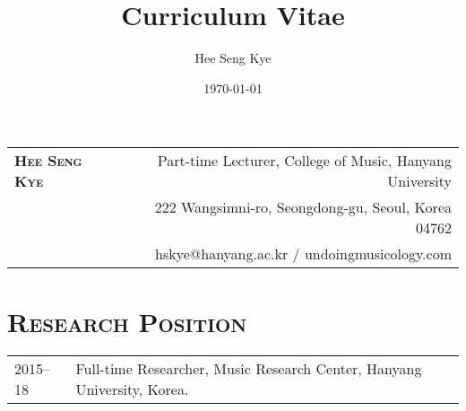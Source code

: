 \documentclass[a4paper,11pt]{article}
\title{Curriculum Vitae}
\author{Hee Seng Kye}
\date{\today}
\begin{document}
  \renewcommand{\headrulewidth}{0pt}
  \fancyhf{}
 
  \fancyfoot[RE,RO]{\small \thepage}
  
  \raggedright \parindent=15pt
  
%  
%  
  
  \hspace*{-0.8cm}
  \begin{tabular}{p{7.26cm} r}
    {\LARGE \textsc{\textbf{Hee Seng Kye}}} & Part-time Lecturer, College of Music, Hanyang University\\
    & 222 Wangsimni-ro, Seongdong-gu, Seoul, Korea 04762\\
    & hskye@hanyang.ac.kr / undoingmusicology.com
  \end{tabular}
  
  \vspace{10mm}
  
%  
%  
  
  \section*{\textsc{Research Position}}
  
  \hspace*{-0.25cm}
  \begin{tabular}{p{2.5cm} l}
    2015--18 & Full-time Researcher, Music Research Center, Hanyang University, Korea.
  \end{tabular}
  
\end{document}
